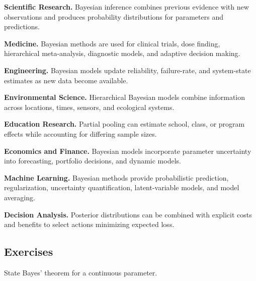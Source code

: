 \begin{applicationbox}

\textbf{Scientific Research.}
Bayesian inference combines previous evidence with new observations and
produces probability distributions for parameters and predictions.

\medskip

\textbf{Medicine.}
Bayesian methods are used for clinical trials, dose finding, hierarchical
meta-analysis, diagnostic models, and adaptive decision making.

\medskip

\textbf{Engineering.}
Bayesian models update reliability, failure-rate, and system-state
estimates as new data become available.

\medskip

\textbf{Environmental Science.}
Hierarchical Bayesian models combine information across locations,
times, sensors, and ecological systems.

\medskip

\textbf{Education Research.}
Partial pooling can estimate school, class, or program effects while
accounting for differing sample sizes.

\medskip

\textbf{Economics and Finance.}
Bayesian models incorporate parameter uncertainty into forecasting,
portfolio decisions, and dynamic models.

\medskip

\textbf{Machine Learning.}
Bayesian methods provide probabilistic prediction, regularization,
uncertainty quantification, latent-variable models, and model averaging.

\medskip

\textbf{Decision Analysis.}
Posterior distributions can be combined with explicit costs and benefits
to select actions minimizing expected loss.

\end{applicationbox}

\subsection{Exercises}
\label{subsec:bayesian-exercises}

\begin{exercise}[1]
State Bayes' theorem for a continuous parameter.
\end{exercise}

